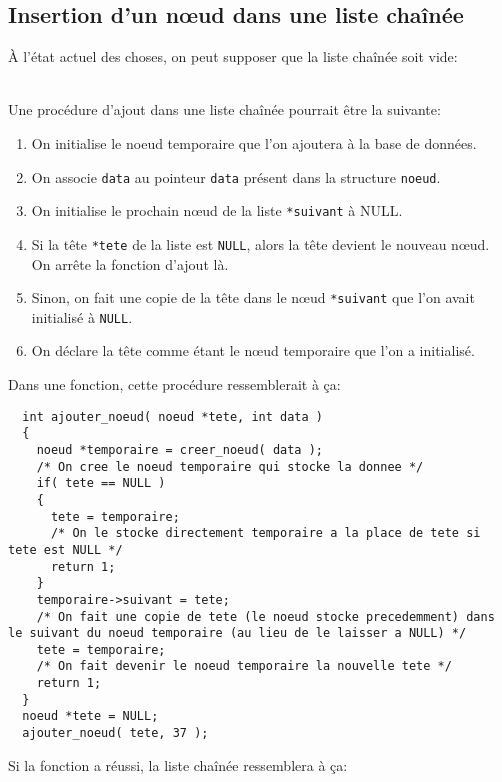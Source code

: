 \documentclass[11pt]{article}
\begin{document}
\subsection{Insertion d'un n\oe{}ud dans une liste chaînée}
À l'état actuel des choses, on peut supposer que la liste chaînée soit vide: 
\\
Une procédure d'ajout dans une liste chaînée pourrait être la suivante:
\begin{enumerate}
\item On initialise le noeud temporaire que l'on ajoutera à la base de données.
\item On associe \texttt{data} au pointeur \texttt{data} présent dans la structure \texttt{noeud}.
\item On initialise le prochain n\oe{}ud de la liste \texttt{*suivant} à NULL.
\item Si la tête \texttt{*tete} de la liste est \texttt{NULL}, alors la tête devient le nouveau n\oe{}ud. On arrête la fonction d'ajout là.
\item Sinon, on fait une copie de la tête dans le n\oe{}ud \texttt{*suivant} que l'on avait initialisé à \texttt{NULL}.
\item On déclare la tête comme étant le n\oe{}ud temporaire que l'on a initialisé.
\end{enumerate}
Dans une fonction, cette procédure ressemblerait à ça:
\begin{lstlisting}
  int ajouter_noeud( noeud *tete, int data )
  {
    noeud *temporaire = creer_noeud( data );
    /* On cree le noeud temporaire qui stocke la donnee */
    if( tete == NULL )
    {
      tete = temporaire;
      /* On le stocke directement temporaire a la place de tete si tete est NULL */
      return 1;
    }
    temporaire->suivant = tete;
    /* On fait une copie de tete (le noeud stocke precedemment) dans le suivant du noeud temporaire (au lieu de le laisser a NULL) */
    tete = temporaire;
    /* On fait devenir le noeud temporaire la nouvelle tete */
    return 1;
  }
  noeud *tete = NULL;
  ajouter_noeud( tete, 37 );
\end{lstlisting}
Si la fonction a réussi, la liste chaînée ressemblera à ça: 
\end{document}
